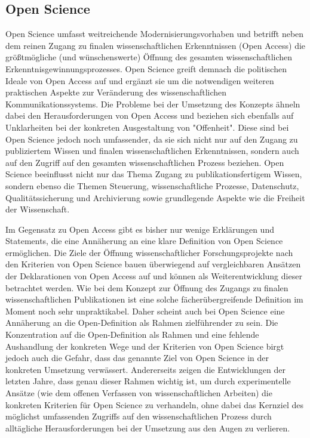 \subsection{Open Science}

Open Science umfasst weitreichende Modernisierungsvorhaben und betrifft neben dem reinen Zugang zu finalen wissenschaftlichen Erkenntnissen (Open Access) die größtmögliche (und wünschenswerte) Öffnung des gesamten wissenschaftlichen Erkenntnisgewinnungsprozesses. Open Science greift demnach die politischen Ideale von Open Access auf und ergänzt sie um die notwendigen weiteren praktischen Aspekte zur Veränderung des wissenschaftlichen Kommunikationssystems. Die Probleme bei der Umsetzung des Konzepts ähneln dabei den Herausforderungen von Open Access und beziehen sich ebenfalls auf Unklarheiten bei der konkreten Ausgestaltung von "Offenheit". Diese sind bei Open Science jedoch noch umfassender, da sie sich nicht nur auf den Zugang zu publiziertem Wissen und finalen wissenschaftlichen Erkenntnissen, sondern auch auf den Zugriff auf den gesamten wissenschaftlichen Prozess beziehen. Open Science beeinflusst nicht nur das Thema Zugang zu publikationsfertigem Wissen, sondern ebenso die Themen Steuerung, wissenschaftliche Prozesse, Datenschutz, Qualitätssicherung und Archivierung sowie grundlegende Aspekte wie die Freiheit der Wissenschaft.

Im Gegensatz zu Open Access gibt es bisher nur wenige Erklärungen und Statements, die eine Annäherung an eine klare Definition von Open Science ermöglichen. Die Ziele der Öffnung wissenschaftlicher Forschungsprojekte nach den Kriterien von Open Science bauen überwiegend auf vergleichbaren Ansätzen der Deklarationen von Open Access auf und können als Weiterentwicklung dieser betrachtet werden. Wie bei dem Konzept zur Öffnung des Zugangs zu finalen wissenschaftlichen Publikationen ist eine solche fächerübergreifende Definition im Moment noch sehr unpraktikabel. Daher scheint auch bei Open Science eine Annäherung an die Open-Definition als Rahmen zielführender zu sein. Die Konzentration auf die Open-Definition als Rahmen und eine fehlende Aushandlung der konkreten Wege und der Kriterien von Open Science birgt jedoch auch die Gefahr, dass das genannte Ziel von Open Science in der konkreten Umsetzung verwässert. Andererseits zeigen die Entwicklungen der letzten Jahre, dass genau dieser Rahmen wichtig ist, um durch experimentelle Ansätze (wie dem offenen Verfassen von wissenschaftlichen Arbeiten) die konkreten Kriterien für Open Science zu verhandeln, ohne dabei das Kernziel des möglichst umfassenden Zugriffs auf den wissenschaftlichen Prozess durch alltägliche Herausforderungen bei der Umsetzung aus den Augen zu verlieren.

